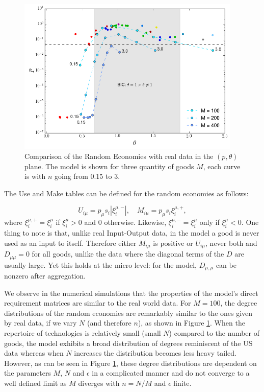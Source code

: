 \begin{figure}[!ht]
  \centering
  \includegraphics[width=0.95\textwidth]{figs_io/theta_pval_model_orig.png}
  \caption{Comparison of the Random Economies with real data in the
    $(p, \theta)$ plane. The model is shown for three quantity of goods
    $M$, each curve is with $n$ going from 0.15 to 3.}
  \label{fig:theta_pval_model_orig}
\end{figure}


The Use and Make tables can be defined for the random economies as
follows:

\begin{equation}
  \label{eq:4}
  U_{i\mu} = p_\mu s_i \left|\xi_i^{\mu, -}\right|, \quad M_{i\mu} =
  p_\mu s_i \xi_i^{\mu, +},
\end{equation}
where $\xi_i^{\mu,+} = \xi_i^\mu$ if $\xi_i^\mu > 0$ and 0
otherwise. Likewise, $\xi_i^{\mu, -} = \xi_i^\mu$ only if
$\xi_i^\mu < 0$. One thing to note is that, unlike real Input-Output data, in
the model a good is never used as an input to itself. Therefore either $M_{i\mu}$ is positive or $U_{i\mu}$, never
both and $D_{\mu\mu} = 0$ for all goods, unlike the data where the
diagonal terms of the $D$ are usually large. Yet this holds at the
micro level: for the model, $D_{\mu,\mu}$ can be nonzero after
aggregation.


We observe in the numerical simulations that the properties of the model's direct requirement matrices are similar to the
real world data. For $M=100$, the degree distributions of the random
economies are remarkably similar to the ones given by real data, if we
vary $N$ (and therefore $n$), as shown in Figure
\ref{fig:theta_pval_model_orig}. When the repertoire of technologies is
relatively small (small $N$) compared to the number of goods, the
model exhibits a broad distribution of degrees reminiscent of the US
data whereas when $N$ increases the distribution becomes less heavy
tailed. However, as can be seen in Figure \ref{fig:theta_pval_model_orig}, these degree distributions are dependent on the
parameters $M$, $N$ and $\epsilon$ in a complicated manner and do
not converge to a well defined limit as $M$ diverges with $n=N/M$ and
$\epsilon$ finite.

